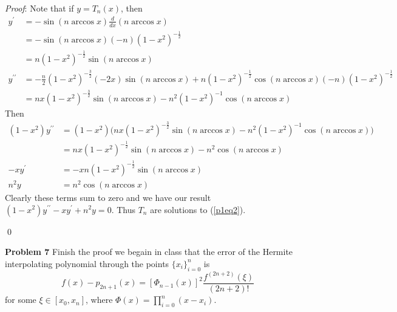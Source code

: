 \documentclass[12pt]{article}
\newcommand{\problem}[1]{\hspace{-4 ex} \large \textbf{Problem #1} }
\renewenvironment{proof}{\hspace{-4 ex} \emph{Proof}:}{\qed}
\begin{document}
	\begin{proof}
		Note that if $y = T_n(x)$, then
		\begin{align*}
		y^\prime & = -\sin{(n \arccos{x})} \tfrac{d}{dx}(n \arccos{x}) \\
		& = -\sin{(n \arccos{x})} (-n)(1-x^2)^{-\frac{1}{2}} \\
		& = n(1-x^2)^{-\frac{1}{2}}\sin{(n \arccos{x})}  \\
		y^{\prime\prime} &= -\tfrac{n}{2}(1-x^2)^{-\frac{3}{2}}(-2x)\sin{(n \arccos{x})} + n(1-x^2)^{-\frac{1}{2}}\cos{(n \arccos{x})}(-n)(1-x^2)^{-\frac{1}{2}} \\
		&= nx(1-x^2)^{-\frac{3}{2}}\sin{(n \arccos{x})} - n^2(1-x^2)^{-1}\cos{(n\arccos{x})}
		\end{align*}
		Then 
		\begin{align*}
		(1-x^2)y^{\prime\prime} & = (1-x^2) \Big( nx(1-x^2)^{-\frac{3}{2}}\sin{(n \arccos{x})} - n^2(1-x^2)^{-1}\cos{(n\arccos{x})} \Big) \\
		& = nx(1-x^2)^{-\frac{1}{2}}\sin{(n \arccos{x})} - n^2\cos{(n\arccos{x})} \\
		-xy^\prime & = -x n(1-x^2)^{-\frac{1}{2}}\sin{(n \arccos{x})} \\
		n^2y & = n^2\cos{(n \arccos{x})}
		\end{align*}
		Clearly these terms sum to zero and we have our result $(1-x^2)y^{\prime\prime}-xy^\prime+n^2y=0$. Thus $T_n$ are solutions to (\ref{p1eq2}).
		
	\end{proof}

\problem{7} Finish the proof we begain in class that the error of the Hermite interpolating polynomial through the points $\{x_i\}_{i=0}^n$ is 
$$
f(x) - p_{2n+1}(x) = [\Phi_{n-1}(x)]^2 \frac{f^{(2n+2)}(\xi)}{(2n+2)!}
$$
for some $\xi \in [x_0, x_n]$, where $\Phi(x) = \prod\limits_{i=0}^n(x-x_i)$.
\end{document}
